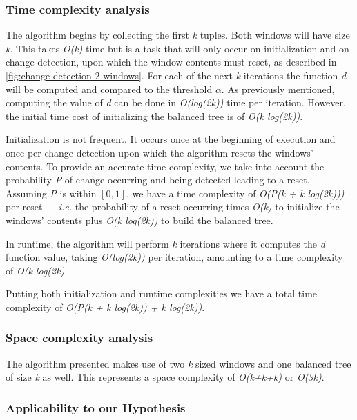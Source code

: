 \subsubsection*{Time complexity analysis}
The algorithm begins by collecting the first \textit{k} tuples. Both windows will have size \textit{k}. This takes \textit{O(k)} time but is a task that will only occur on initialization and on change detection, upon which the window contents must reset, as described in \ref{fig:change-detection-2-windows}. For each of the next \textit{k} iterations the function \textit{d} will be computed and compared to the threshold $\alpha$. As previously mentioned, computing the value of \textit{d} can be done in \textit{O(log(2k))} time per iteration. However, the initial time cost of initializing the balanced tree is of \textit{O(k log(2k))}. 

Initialization is not frequent. It occurs once at the beginning of execution and once per change detection upon which the algorithm resets the windows' contents. To provide an accurate time complexity, we take into account the probability \textit{P} of change occurring and being detected leading to a reset. Assuming \textit{P} is within $[0, 1]$, we have a time complexity of \textit{O(P(k + k log(2k)))} per reset --- \textit{i.e.} the probability of a reset occurring times \textit{O(k)} to initialize the windows' contents plus \textit{O(k log(2k))} to build the balanced tree.

In runtime, the algorithm will perform \textit{k} iterations where it computes the \textit{d} function value, taking \textit{O(log(2k))} per iteration, amounting to a time complexity of \textit{O(k log(2k)}.

Putting both initialization and runtime complexities we have a total time complexity of \textit{O(P(k + k log(2k)) + k log(2k))}.

\subsubsection*{Space complexity analysis}

The algorithm presented makes use of two \textit{k} sized windows and one balanced tree of size \textit{k} as well. This represents a space complexity of \textit{O(k+k+k)} or \textit{O(3k)}.

\subsubsection*{Applicability to our Hypothesis}

